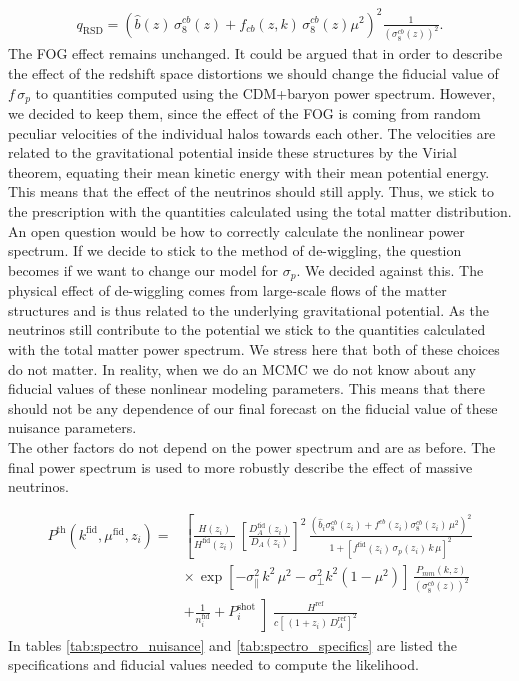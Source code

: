 \documentclass[../main.tex]{subfiles}
\begin{document}
\begin{align*}
    q_\mathrm{RSD} = \left(\hat{b}(z) \,\sigma_8^{cb}(z)+f_{cb}(z,k) \,\sigma_8^{cb}(z)\mu^2\right)^2 \frac{1}{\left(\sigma_8^{cb}(z)\right)^2} .
\end{align*} 
The FOG effect remains unchanged. It could be argued that in order to describe the effect of the redshift space distortions we should change the fiducial value of $f\,\sigma_p$ to quantities computed using the CDM+baryon power spectrum. However, we decided to keep them, since the effect of the FOG is coming from random peculiar velocities of the individual halos towards each other. The velocities are related to the gravitational potential inside these structures by the Virial theorem, equating their mean kinetic energy with their mean potential energy. This means that the effect of the neutrinos should still apply. Thus, we stick to the prescription with the quantities calculated using the total matter distribution.\\
An open question would be how to correctly calculate the nonlinear power spectrum. If we decide to stick to the method of de-wiggling, the question becomes if we want to change our model for $\sigma_p$. We decided against this. The physical effect of de-wiggling comes from large-scale flows of the matter structures and is thus related to the underlying gravitational potential. As the neutrinos still contribute to the potential we stick to the quantities calculated with the total matter power spectrum. We stress here that both of these choices do not matter. In reality, when we do an MCMC we do not know about any fiducial values of these nonlinear modeling parameters. This means that there should not be any dependence of our final forecast on the fiducial value of these nuisance parameters.\\
The other factors do not depend on the power spectrum and are as before. The final power spectrum is used to more robustly describe the effect of massive neutrinos. 

\begin{align}
    P^\mathrm{th}(k^\mathrm{fid},\mu^\mathrm{fid},z_i) =& \left[\frac{H(z_i)}{H^\mathrm{fid}(z_i)}\, \left[\frac{D^\mathrm{fid}_A(z_i)}{D_A(z_i)}\right]^2 \, \frac{\left(\hat{b}_i \sigma^{cb}_8(z_i) + f^{cb}(z_i) \sigma^{cb}_8(z_i) \,\mu^2 \right)^2}{1+\left[f^\mathrm{fid}(z_i)\,\sigma_p(z_i)\,k\,\mu\right]^2} \right. \nonumber\\
    &\times\,\exp\left[- \sigma_\|^2 \, k^2\,\mu^2 - \sigma_\perp^2 k^2 \left(1-\mu^2\right) \right]\, \frac{P_{mm}(k,z)}{\left(\sigma_8^{cb}(z)\right)^2}  \\
    &+ \left.\frac{1}{n_i^\mathrm{fid}} + P_i^\mathrm{shot}\middle] \frac{H^\mathrm{ref}}{c\left[ \,(1+z_i)\,D_A^\mathrm{ref}\right]^2}\right.\nonumber
\end{align} 
In tables \ref{tab:spectro_nuisance} and \ref{tab:spectro_specifics} are listed the specifications and fiducial values needed to compute the likelihood.
\end{document}
